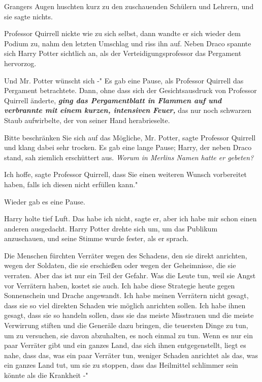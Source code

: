 Grangers Augen huschten kurz zu den zuschauenden Schülern und Lehrern, und sie
sagte nichts.

Professor Quirrell nickte wie zu sich selbst, dann wandte er sich wieder dem
Podium zu, nahm den letzten Umschlag und riss ihn auf. Neben Draco spannte sich
Harry Potter sichtlich an, als der Verteidigungsprofessor das Pergament
hervorzog.

\glqq{}Und Mr. Potter wünscht sich -" Es gab eine Pause, als Professor Quirrell
das Pergament betrachtete. Dann, ohne dass sich der Gesichtsausdruck von
Professor Quirrell änderte,\textbf{\emph{ ging das Pergamentblatt in Flammen auf
und verbrannte mit einem kurzen, intensiven Feuer,}} das nur noch schwarzen
Staub aufwirbelte, der von seiner Hand herabrieselte.

\glqq{}Bitte beschränken Sie sich auf das Mögliche, Mr. Potter\grqq{}, sagte
Professor Quirrell und klang dabei sehr trocken. Es gab eine lange Pause; Harry,
der neben Draco stand, sah ziemlich erschüttert aus. \emph{Worum in Merlins
Namen hatte er gebeten?}

\glqq{}Ich hoffe\grqq{}, sagte Professor Quirrell, \glqq{}dass Sie einen weiteren
Wunsch vorbereitet haben, falls ich diesen nicht erfüllen kann."

Wieder gab es eine Pause.

Harry holte tief Luft. \glqq{}Das habe ich nicht\grqq{}, sagte er, \glqq{}aber ich
habe mir schon einen anderen ausgedacht.\grqq{} Harry Potter drehte sich um, um
das Publikum anzuschauen, und seine Stimme wurde fester, als er sprach.

\glqq{}Die Menschen fürchten Verräter wegen des Schadens, den sie direkt
anrichten, wegen der Soldaten, die sie erschießen oder wegen der Geheimnisse,
die sie verraten. Aber das ist nur ein Teil der Gefahr. Was die Leute tun, weil
sie Angst vor Verrätern haben, kostet sie auch. Ich habe diese Strategie heute
gegen Sonnenschein und Drache angewandt. Ich habe meinen Verrätern nicht gesagt,
dass sie so viel direkten Schaden wie möglich anrichten sollen. Ich habe ihnen
gesagt, dass sie so handeln sollen, dass sie das meiste Misstrauen und die
meiste Verwirrung stiften und die Generäle dazu bringen, die teuersten Dinge zu
tun, um zu versuchen, sie davon abzuhalten, es noch einmal zu tun. Wenn es nur
ein paar Verräter gibt und ein ganzes Land, das sich ihnen entgegenstellt, liegt
es nahe, dass das, was ein paar Verräter tun, weniger Schaden anrichtet als das,
was ein ganzes Land tut, um sie zu stoppen, dass das Heilmittel schlimmer sein
könnte als die Krankheit -"

